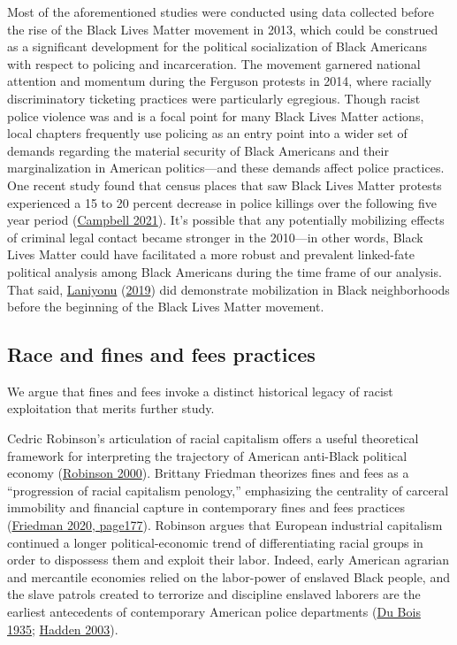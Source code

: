 \documentclass[
  12pt,
]{article}
\begin{document}
Most of the aforementioned studies were conducted using data collected before the rise of the Black Lives Matter movement in 2013, which could be construed as a significant development for the political socialization of Black Americans with respect to policing and incarceration. The movement garnered national attention and momentum during the Ferguson protests in 2014, where racially discriminatory ticketing practices were particularly egregious. Though racist police violence was and is a focal point for many Black Lives Matter actions, local chapters frequently use policing as an entry point into a wider set of demands regarding the material security of Black Americans and their marginalization in American politics---and these demands affect police practices. One recent study found that census places that saw Black Lives Matter protests experienced a 15 to 20 percent decrease in police killings over the following five year period (\protect\hyperlink{ref-Campbell2021}{Campbell 2021}). It's possible that any potentially mobilizing effects of criminal legal contact became stronger in the 2010---in other words, Black Lives Matter could have facilitated a more robust and prevalent linked-fate political analysis among Black Americans during the time frame of our analysis. That said, \protect\hyperlink{ref-Laniyonu2019}{Laniyonu} (\protect\hyperlink{ref-Laniyonu2019}{2019}) did demonstrate mobilization in Black neighborhoods before the beginning of the Black Lives Matter movement.

\hypertarget{race-and-fines-and-fees-practices}{%
\subsection*{Race and fines and fees practices}\label{race-and-fines-and-fees-practices}}

We argue that fines and fees invoke a distinct historical legacy of racist exploitation that merits further study.

Cedric Robinson's articulation of racial capitalism offers a useful theoretical framework for interpreting the trajectory of American anti-Black political economy (\protect\hyperlink{ref-Robinson2000}{Robinson 2000}). Brittany Friedman theorizes fines and fees as a ``progression of racial capitalism penology,'' emphasizing the centrality of carceral immobility and financial capture in contemporary fines and fees practices (\protect\hyperlink{ref-Friedman2020}{Friedman 2020, page177}). Robinson argues that European industrial capitalism continued a longer political-economic trend of differentiating racial groups in order to dispossess them and exploit their labor. Indeed, early American agrarian and mercantile economies relied on the labor-power of enslaved Black people, and the slave patrols created to terrorize and discipline enslaved laborers are the earliest antecedents of contemporary American police departments (\protect\hyperlink{ref-DuBois1935}{Du Bois 1935}; \protect\hyperlink{ref-Hadden2003}{Hadden 2003}).
\end{document}
